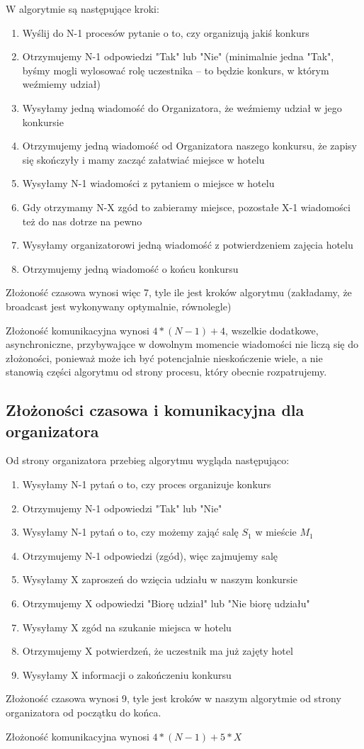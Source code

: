 \documentclass{article}
\begin{document}
W algorytmie są następujące kroki:

\begin{enumerate}
\item Wyślij do N-1 procesów pytanie o to, czy organizują jakiś konkurs
\item Otrzymujemy N-1 odpowiedzi "Tak" lub "Nie" (minimalnie jedna "Tak", byśmy mogli wylosować rolę uczestnika -- to będzie konkurs, w którym weźmiemy udział)
\item Wysyłamy jedną wiadomość do Organizatora, że weźmiemy udział w jego konkursie
\item Otrzymujemy jedną wiadomość od Organizatora naszego konkursu, że zapisy się skończyły i mamy zacząć załatwiać miejsce w hotelu
\item Wysyłamy N-1 wiadomości z pytaniem o miejsce w hotelu
\item Gdy otrzymamy N-X zgód to zabieramy miejsce, pozostałe X-1 wiadomości też do nas dotrze na pewno
\item Wysyłamy organizatorowi jedną wiadomość z potwierdzeniem zajęcia hotelu
\item Otrzymujemy jedną wiadomość o końcu konkursu
\end{enumerate}

Złożoność czasowa wynosi więc 7, tyle ile jest kroków algorytmu (zakładamy, że broadcast jest wykonywany optymalnie, równolegle)

Złożoność komunikacyjna wynosi $4 * (N - 1) + 4$, wszelkie dodatkowe, asynchroniczne, przybywające w dowolnym momencie wiadomości nie liczą się do złożoności, ponieważ może ich być potencjalnie nieskończenie wiele, a nie stanowią części algorytmu od strony procesu, który obecnie rozpatrujemy.

\subsection{Złożoności czasowa i komunikacyjna dla organizatora}

Od strony organizatora przebieg algorytmu wygląda następująco:

\begin{enumerate}
\item Wysyłamy N-1 pytań o to, czy proces organizuje konkurs
\item Otrzymujemy N-1 odpowiedzi "Tak" lub "Nie"
\item Wysyłamy N-1 pytań o to, czy możemy zająć salę $S_{1}$ w mieście $M_{1}$
\item Otrzymujemy N-1 odpowiedzi (zgód), więc zajmujemy salę
\item Wysyłamy X zaproszeń do wzięcia udziału w naszym konkursie
\item Otrzymujemy X odpowiedzi "Biorę udział" lub "Nie biorę udziału"
\item Wysyłamy X zgód na szukanie miejsca w hotelu
\item Otrzymujemy X potwierdzeń, że uczestnik ma już zajęty hotel
\item Wysyłamy X informacji o zakończeniu konkursu
\end{enumerate}

Złożoność czasowa wynosi 9, tyle jest kroków w naszym algorytmie od strony organizatora od początku do końca.

Złożoność komunikacyjna wynosi $4 * (N - 1) + 5 * X$





\end{document}
